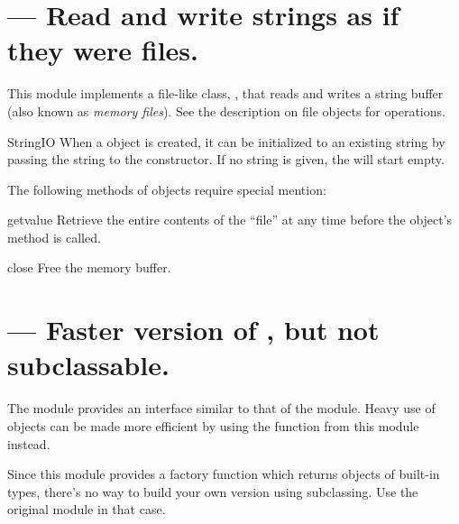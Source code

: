 \section{ ---
         Read and write strings as if they were files.}




This module implements a file-like class, ,
that reads and writes a string buffer (also known as \emph{memory
files}). See the description on file objects for operations.

\begin{classdesc}{StringIO}{}
When a  object is created, it can be initialized
to an existing string by passing the string to the constructor.
If no string is given, the  will start empty.
\end{classdesc}

The following methods of  objects require special
mention:

\begin{methoddesc}{getvalue}{}
Retrieve the entire contents of the ``file'' at any time before the
 object's  method is called.
\end{methoddesc}

\begin{methoddesc}{close}{}
Free the memory buffer.
\end{methoddesc}


\section{ ---
         Faster version of , but not subclassable.}




The module  provides an interface similar to that of
the  module.  Heavy use of 
objects can be made more efficient by using the function
 from this module instead.

Since this module provides a factory function which returns objects of
built-in types, there's no way to build your own version using
subclassing.  Use the original  module in that case.
